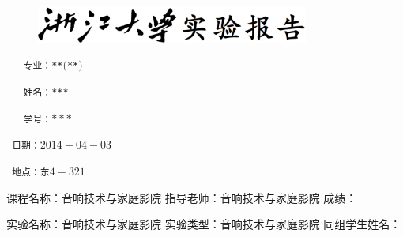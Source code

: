 \documentclass{report}
\begin{document}
\begin{CJK}{GBK}{hei} %

\begin{figure}

  \includegraphics[width=0.8\textwidth]{report.jpg}

\end{figure}
\texttt{   专业：**$($**$)$ }\par
\texttt{   姓名：*** }\par
\texttt{   学号：$*** $}\par
\texttt{   日期：$2014-04-03 $}\par
\texttt{   地点：东$4-321$ }\par
\begin{flushleft}
课程名称：音响技术与家庭影院 指导老师：音响技术与家庭影院  成绩：
\end{flushleft}
\begin{flushleft}
实验名称：音响技术与家庭影院 实验类型：音响技术与家庭影院 同组学生姓名：
\end{flushleft}
\end{CJK}
\end{document}
